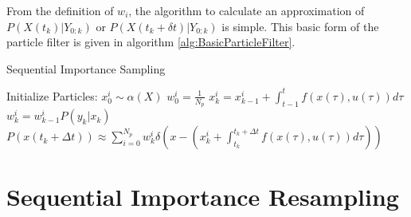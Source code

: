 From the definition of $w_i$, the algorithm to calculate
an approximation of $P(X(t_k) | Y_{0:k})$ or $P(X(t_k + \delta t) | Y_{0:k})$
is simple. This basic form of the particle filter is given in 
algorithm \autoref{alg:BasicParticleFilter}.

\begin{algorithm}
\caption{Sequential Importance Sampling}
\begin{algorithmic}
\STATE Initialize Particles:
    \STATE $x^i_0  \sim \alpha(X)$
    \STATE $w^i_0 = \frac{1}{N_p}$
\ENDFOR
{}
        \STATE $x^i_k = x^i_{k-1} + \int_{t-1}^t f(x(\tau), u(\tau)) d\tau $
        \STATE $w^i_k = w^i_{k-1}P(y_k | x_k)$
    \ENDFOR
\ENDFOR
\STATE $P(x(t_k+\Delta t)) \approx 
\sum_{i=0}^{N_p} w^i_k \delta\left(x - (x^i_k + \int_{t_k}^{t_k+\Delta t} f(x(\tau), u(\tau)) d\tau) \right)$
\end{algorithmic}
\label{alg:BasicParticleFilter}
\end{algorithm}

\section{Sequential Importance Resampling}
\label{sec:Particle Filter Resampling}

